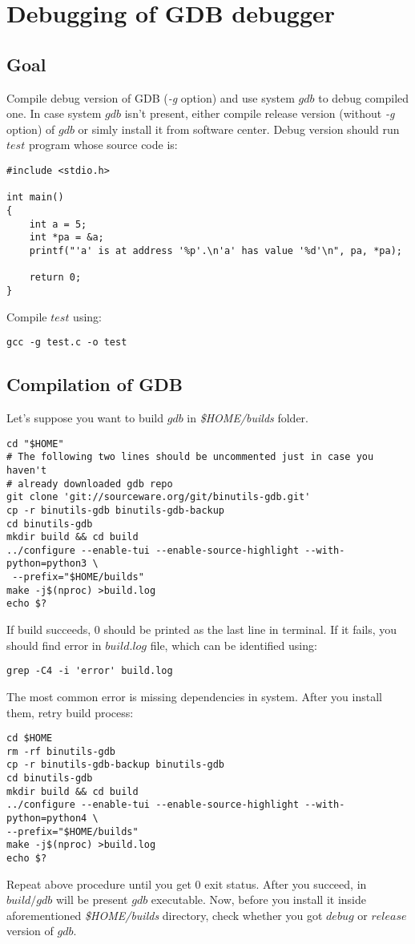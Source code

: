 \documentclass{report}
\begin{document}
\chapter *{Debugging of GDB debugger}
\section *{Goal}
Compile debug version of GDB (\textit{-g} option) and use system $gdb$ to debug compiled one. In case system $gdb$ isn't present, either compile release version (without \textit{-g} option) of $gdb$ or simly install it from software center. Debug version should run $test$ program whose source code is:
\begin{verbatim}
#include <stdio.h>
   
int main()
{
	int a = 5;
	int *pa = &a;
	printf("'a' is at address '%p'.\n'a' has value '%d'\n", pa, *pa);

	return 0;
}
\end{verbatim}
Compile $test$ using:
\begin{verbatim}
gcc -g test.c -o test
\end{verbatim}
\section *{Compilation of GDB}
Let's suppose you want to build $gdb$ in \textit{\$HOME/builds} folder. 
\begin{verbatim}
cd "$HOME"
# The following two lines should be uncommented just in case you haven't 
# already downloaded gdb repo
git clone 'git://sourceware.org/git/binutils-gdb.git'
cp -r binutils-gdb binutils-gdb-backup   
cd binutils-gdb
mkdir build && cd build
../configure --enable-tui --enable-source-highlight --with-python=python3 \
 --prefix="$HOME/builds"
make -j$(nproc) >build.log
echo $?
\end{verbatim}
If build succeeds, $0$ should be printed as the last line in terminal. If it fails, you should find error in $build.log$ file, which can be identified using:
\begin{verbatim}
grep -C4 -i 'error' build.log
\end{verbatim}
The most common error is missing dependencies in system. After you install them, retry build process:
\begin{verbatim}
cd $HOME
rm -rf binutils-gdb
cp -r binutils-gdb-backup binutils-gdb
cd binutils-gdb
mkdir build && cd build
../configure --enable-tui --enable-source-highlight --with-python=python4 \
--prefix="$HOME/builds"
make -j$(nproc) >build.log
echo $?
\end{verbatim}
Repeat above procedure until you get $0$ exit status. After you succeed, in $build/gdb$ will be present $gdb$ executable. Now, before you install it inside aforementioned \textit{\$HOME/builds} directory, check whether you got $debug$ or $release$ version of $gdb$.
\end{document}
